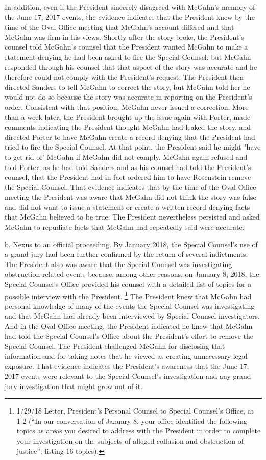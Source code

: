 {In addition, even if the President sincerely disagreed with McGahn's memory of the June 17, 2017 events, the evidence indicates that the President knew by the time of the Oval Office
meeting that McGahn's account differed and that McGahn was firm in his views.
Shortly after the story broke, the President's counsel told McGahn's counsel that the President wanted McGahn to make a statement denying he had been asked to fire the Special Counsel, but McGahn responded through his counsel that that aspect of the story was accurate and he therefore could not comply with the President's request.
The President then directed Sanders to tell McGahn to correct the story, but McGahn told her he would not do so because the story was accurate in reporting on the President's order.
Consistent with that position, McGahn never issued a correction.
More than a week later, the President brought up the issue again with Porter, made comments indicating the President thought McGahn had leaked the story, and directed Porter to have McGahn create a record denying that the President had tried to fire the Special Counsel.
At that point, the President said he might "have to get rid of' McGahn if McGahn did not comply.
McGahn again refused and told Porter, as he had told Sanders and as his counsel had told the President's counsel, that the President had in fact ordered him to have Rosenstein remove the Special Counsel.
That evidence indicates that by the time of the Oval Office meeting the President was aware that McGahn did not think the story was false and did not want to issue a statement or create a written record denying facts that McGahn believed to be true.
The President nevertheless persisted and asked McGahn to repudiate facts that McGahn had repeatedly said were accurate.

b. Nexus to an official proceeding.
By January 2018, the Special Counsel's use of a grand jury had been further confirmed by the return of several indictments.
The President also was aware that the Special Counsel was investigating obstruction-related events because, among other reasons, on January 8, 2018, the Special Counsel's Office provided his counsel with a detailed list of topics for a possible interview with the President.%
\footnote{1/29/18 Letter, President’s Personal Counsel to Special Counsel’s Office, at 1-2 (“In our conversation of January 8, your office identified the following topics as areas you desired to address with the President in order to complete your investigation on the subjects of alleged collusion and obstruction of justice”;
listing 16 topics).}
The President knew that McGahn had personal knowledge of many of the events the Special Counsel was investigating and that McGahn had already been interviewed by Special Counsel investigators.
And in the Oval Office meeting, the President indicated he knew that McGahn had told the Special Counsel's Office about the President's effort to remove the Special Counsel.
The President challenged McGahn for disclosing that information and for taking notes that he viewed as creating unnecessary legal exposure.
That evidence indicates the President's awareness that the June 17, 2017 events were relevant to the Special Counsel's investigation and any grand jury investigation that might grow out of it.

}
